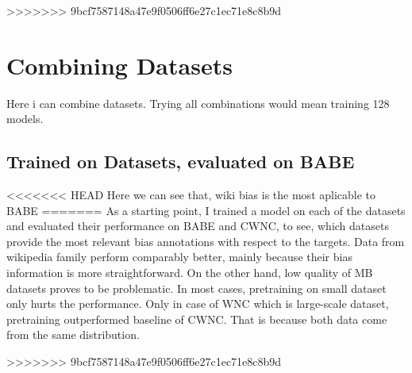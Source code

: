 >>>>>>> 9bcf7587148a47e9f0506ff6e27c1ec71e8c8b9d
 
  

 
 
 \section{Combining Datasets}
 Here i can combine datasets. Trying all combinations would mean training 128 models.
 
 \subsection{Trained on Datasets, evaluated on BABE}
<<<<<<< HEAD
 Here we can see that, wiki bias is the most aplicable to BABE
=======
 As a starting point, I trained a model on each of the datasets and evaluated their performance on BABE and CWNC, to see, which datasets provide the most relevant bias annotations with respect to the targets. Data from wikipedia family perform comparably better, mainly because their bias information is more straightforward. On the other hand, low quality of MB datasets proves to be problematic. In most cases, pretraining on small dataset only hurts the performance. Only in case of WNC which is large-scale dataset, pretraining outperformed baseline of CWNC. That is because both data come from the same distribution.
 
 
 
 
>>>>>>> 9bcf7587148a47e9f0506ff6e27c1ec71e8c8b9d
 
